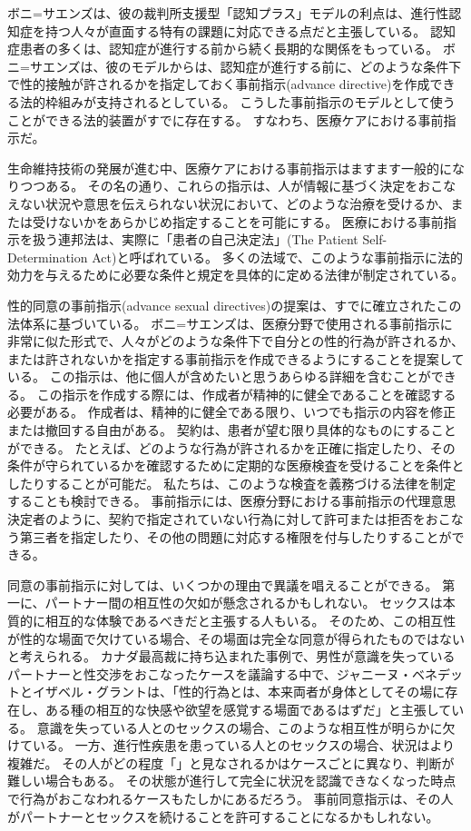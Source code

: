 \documentclass[paper=a4,book,openany]{jlreq}
\begin{document}
ボニ=サエンズは、彼の裁判所支援型「認知プラス」モデルの利点は、進行性認知症を持つ人々が直面する特有の課題に対応できる点だと主張している。
認知症患者の多くは、認知症が進行する前から続く長期的な関係をもっている。
ボニ=サエンズは、彼のモデルからは、認知症が進行する前に、どのような条件下で性的接触が許されるかを指定しておく事前指示(advance directive)を作成できる法的枠組みが支持されるとしている。
こうした事前指示のモデルとして使うことができる法的装置がすでに存在する。
すなわち、医療ケアにおける事前指示だ。

生命維持技術の発展が進む中、医療ケアにおける事前指示はますます一般的になりつつある。
その名の通り、これらの指示は、人が情報に基づく決定をおこなえない状況や意思を伝えられない状況において、どのような治療を受けるか、または受けないかをあらかじめ指定することを可能にする。
医療における事前指示を扱う連邦法は、実際に「患者の自己決定法」(The Patient Self-Determination Act)と呼ばれている。
多くの法域で、このような事前指示に法的効力を与えるために必要な条件と規定を具体的に定める法律が制定されている\citep[cf.][]{srebnik99:_advan_direc_mental_healt_treat}。

性的同意の事前指示(advance sexual directives)の提案は、すでに確立されたこの法体系に基づいている。
ボニ=サエンズは、医療分野で使用される事前指示に非常に似た形式で、人々がどのような条件下で自分との性的行為が許されるか、または許されないかを指定する事前指示を作成できるようにすることを提案している\citep{boni-saenz15:_sexual_incap}。
この指示は、他に個人が含めたいと思うあらゆる詳細を含むことができる。
この指示を作成する際には、作成者が精神的に健全であることを確認する必要がある。
作成者は、精神的に健全である限り、いつでも指示の内容を修正または撤回する自由がある。
契約は、患者が望む限り具体的なものにすることができる。
たとえば、どのような行為が許されるかを正確に指定したり、その条件が守られているかを確認するために定期的な医療検査を受けることを条件としたりすることが可能だ。
私たちは、このような検査を義務づける法律を制定することも検討できる。
事前指示には、医療分野における事前指示の代理意思決定者のように、契約で指定されていない行為に対して許可または拒否をおこなう第三者を指定したり、その他の問題に対応する権限を付与したりすることができる。

同意の事前指示に対しては、いくつかの理由で異議を唱えることができる。
第一に、パートナー間の相互性の欠如が懸念されるかもしれない。
セックスは本質的に相互的な体験であるべきだと主張する人もいる。
そのため、この相互性が性的な場面で欠けている場合、その場面は完全な同意が得られたものではないと考えられる。
カナダ最高裁に持ち込まれた事例で、男性が意識を失っているパートナーと性交渉をおこなったケースを議論する中で、ジャニーヌ・ベネデットとイザベル・グラントは、「性的行為とは、本来両者が身体としてその場に存在し、ある種の相互的な快感や欲望を感覚する場面であるはずだ」と主張している\citep[p.80]{benedet10:confusing}。
意識を失っている人とのセックスの場合、このような相互性が明らかに欠けている。
一方、進行性疾患を患っている人とのセックスの場合、状況はより複雑だ。
その人がどの程度「」と見なされるかはケースごとに異なり、判断が難しい場合もある。
その状態が進行して完全に状況を認識できなくなった時点で行為がおこなわれるケースもたしかにあるだろう。
事前同意指示は、その人がパートナーとセックスを続けることを許可することになるかもしれない。
\end{document}
